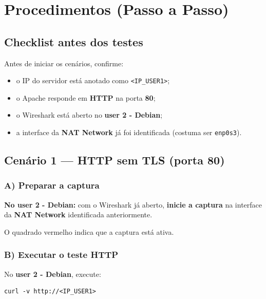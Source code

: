 \section{Procedimentos (Passo a Passo)}

\subsection*{Checklist antes dos testes}

Antes de iniciar os cenários, confirme:
\begin{itemize}
  \item o IP do servidor está anotado como \texttt{<IP\_USER1>};
  \item o Apache responde em \textbf{HTTP} na porta \textbf{80};
  \item o Wireshark está aberto no \textbf{user 2 - Debian};
  \item a interface da \textbf{NAT Network} já foi identificada (costuma ser \texttt{enp0s3}).
\end{itemize}

\subsection{Cenário 1 --- HTTP sem TLS (porta 80)}

\subsubsection*{A) Preparar a captura}

\textbf{No user 2 - Debian:} com o Wireshark já aberto, \textbf{inicie a captura} na interface da \textbf{NAT Network} identificada anteriormente.



\begin{notebox}
O quadrado vermelho indica que a captura está ativa.
\end{notebox}

\subsubsection*{B) Executar o teste HTTP}

No \textbf{user 2 - Debian}, execute:
\begin{lstlisting}
curl -v http://<IP_USER1>
\end{lstlisting}

